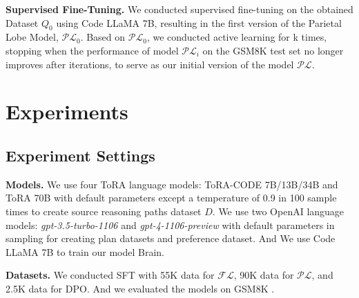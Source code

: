 \documentclass[11pt]{article}
\begin{document}
\textbf{Supervised Fine-Tuning.} We conducted supervised fine-tuning on the obtained Dataset $Q_0$ using Code LLaMA 7B, resulting in the first version of the Parietal Lobe Model, $\mathcal{PL}_0$.
Based on $\mathcal{PL}_0$, we conducted active learning for k times, stopping when the performance of model $\mathcal{PL}_i$ on the GSM8K test set no longer improves after iterations, to serve as our initial version of the model $\mathcal{PL}$. 

\section{Experiments}


\subsection{Experiment Settings}

\textbf{Models.} We use four ToRA language models: ToRA-CODE 7B/13B/34B and ToRA 70B with default parameters except a temperature of 0.9 in 100 sample times to create source reasoning paths dataset $D$. We use two OpenAI language models: \textit{gpt-3.5-turbo-1106} and \textit{gpt-4-1106-preview} with default parameters in sampling for creating plan datasets and preference dataset. And We use Code LLaMA 7B to train our model Brain.

\textbf{Datasets.} We conducted SFT with 55K data for $\mathcal{FL}$, 90K data for $\mathcal{PL}$, and 2.5K data for DPO. And we evaluated the models on GSM8K \citep{cobbeTrainingVerifiersSolve2021}. 
\end{document}
